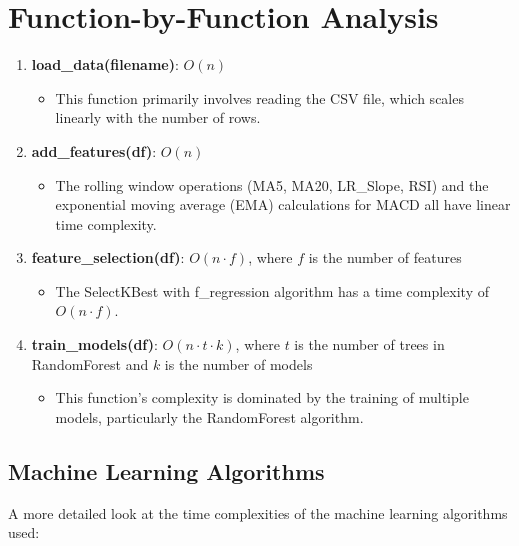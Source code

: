 \documentclass[11pt,a4paper]{article}
\begin{document}
\section{Function-by-Function Analysis}

\begin{enumerate}
    \item \textbf{load\_data(filename)}: $O(n)$
    \begin{itemize}
        \item This function primarily involves reading the CSV file, which scales linearly with the number of rows.
    \end{itemize}
    
    \item \textbf{add\_features(df)}: $O(n)$
    \begin{itemize}
        \item The rolling window operations (MA5, MA20, LR\_Slope, RSI) and the exponential moving average (EMA) calculations for MACD all have linear time complexity.
    \end{itemize}
    
    \item \textbf{feature\_selection(df)}: $O(n \cdot f)$, where $f$ is the number of features
    \begin{itemize}
        \item The SelectKBest with f\_regression algorithm has a time complexity of $O(n \cdot f)$.
    \end{itemize}
    
    \item \textbf{train\_models(df)}: $O(n \cdot t \cdot k)$, where $t$ is the number of trees in RandomForest and $k$ is the number of models
    \begin{itemize}
        \item This function's complexity is dominated by the training of multiple models, particularly the RandomForest algorithm.
    \end{itemize}
\end{enumerate}

\subsection{Machine Learning Algorithms}
A more detailed look at the time complexities of the machine learning algorithms used:
\end{document}
